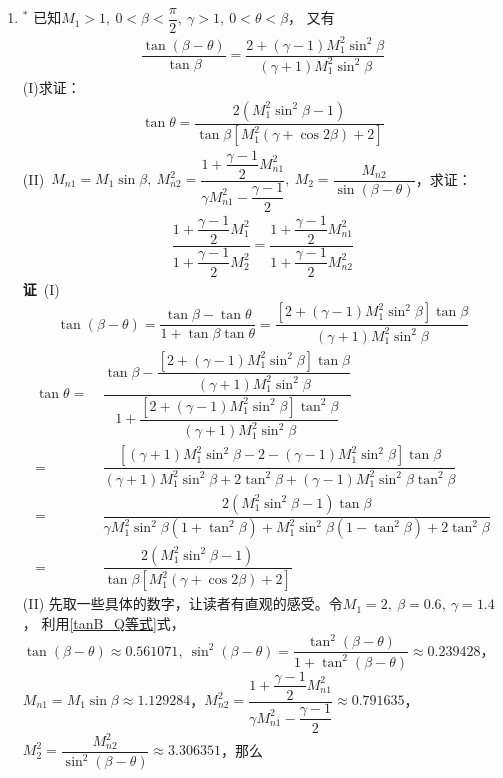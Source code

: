 \begin{enumerate}[label={【\textbf{例\thechapter.\arabic*}】},
 leftmargin=\inteval{\myenumleftmargin}pt,
 itemsep=\inteval{\myenumitempsep}pt,
 itemindent=\inteval{\myenumitemindent}pt]
\item $ ^* $ 
已知$ M_1>1,\ 0<\beta<\dfrac{\pi}{2},\ \gamma>1,\ 0<\theta<\beta $，
又有
\begin{align*}
    \dfrac{\tan(\beta-\theta)}{\tan\beta}=\dfrac{2+(\gamma-1)M_1^2\sin^2\beta
    }{(\gamma+1)M_1^2\sin^2\beta}
\end{align*}
(I)求证：
\begin{align}\label{Q-B-M关系}
    \tan\theta=\dfrac{2(M_1^2\sin^2\beta-1)}{\tan\beta[M_1^2(\gamma+\cos2\beta)+2]}
\end{align} 
(II)\ $ M_{n1}=M_1\sin\beta,\ M_{n2}^2=\dfrac{1+\dfrac{\gamma-1}{2}M_{n1}^2}{
    \gamma M_{n1}^2-\dfrac{\gamma-1}{2}},\ M_2=\dfrac{M_{n2}}{\sin(\beta-
    \theta)} $，求证：
\begin{align}\label{斜激波比值等式}
    \dfrac{1+\dfrac{\gamma-1}{2}M_1^2}{1+\dfrac{\gamma-1}{2}M_2^2}=
    \dfrac{1+\dfrac{\gamma-1}{2}M_{n1}^2}{1+\dfrac{\gamma-1}{2}M_{n2}^2}
\end{align}
\textbf{证}\ (I)
\begin{align}\label{tanB_Q等式}
    \tan(\beta-\theta)=\dfrac{\tan\beta-\tan\theta}{1+\tan\beta\tan\theta}=
    \dfrac{[2+(\gamma-1)M_1^2\sin^2\beta]
        \tan\beta}{(\gamma+1)M_1^2\sin^2\beta}
\end{align}
\begin{align*}
    \tan\theta
    =&\ \dfrac{\tan\beta-\dfrac{[2+(\gamma-1)M_1^2\sin^2\beta]
            \tan\beta}{(\gamma+1)M_1^2\sin^2\beta}}
    {1+\dfrac{[2+(\gamma-1)M_1^2\sin^2\beta]
            \tan^2\beta}{(\gamma+1)M_1^2\sin^2\beta}} \\
    =&\ \dfrac{[(\gamma+1)M_1^2\sin^2\beta-2-(\gamma-1)M_1^2\sin^2\beta]\tan\beta}
    {(\gamma+1)M_1^2\sin^2\beta+2\tan^2\beta+(\gamma-1)M_1^2\sin^2\beta\tan^2\beta} \\
    =&\ \dfrac{2(M_1^2\sin^2\beta-1)\tan\beta}{\gamma M_1^2\sin^2\beta(1+\tan^2\beta)+
        M_1^2\sin^2\beta(1-\tan^2\beta)+2\tan^2\beta } \\
    =&\ \dfrac{2(M_1^2\sin^2\beta-1)}{\tan\beta[M_1^2(\gamma+\cos2\beta)+2]}
\end{align*}
(II) 先取一些具体的数字，让读者有直观的感受。令$ M_1=2,\ \beta=0.6,\ \gamma=1.4 $，
利用\eqref{tanB_Q等式}式，$ \tan(\beta-\theta)\approx 0.561071,\ 
\sin^2(\beta-\theta)=\dfrac{\tan^2(\beta-\theta)}{1+\tan^2(\beta-
    \theta)}\approx 0.239428 $，
$ M_{n1}=M_1\sin\beta\approx 1.129284 $，$ M_{n2}^2=\dfrac{
    1+\dfrac{\gamma-1}{2}M_{n1}^2}{\gamma M_{n1}^2
    -\dfrac{\gamma-1}{2}}\approx 0.791635 $，
$ M_2^2=\dfrac{M_{n2}^2}{\sin^2(\beta-\theta)}\approx 3.306351 $，那么

\end{enumerate}
